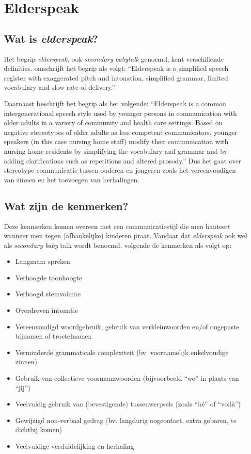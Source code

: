 \section{Elderspeak}

\subsection{Wat is \textit{elderspeak}?}

Het begrip \textit{elderspeak}, ook \textit{secondary babytalk} genoemd, kent verschillende definities. \textcite{Kemper1998} omschrijft het begrip als volgt:
``Elderspeak is a simplified speech register with exaggerated pitch and intonation, simplified grammar, limited vocabulary and slow rate of delivery.''

Daarnaast beschrijft \textcite{Williams2011} het begrip als het volgende:
``Elderspeak is a common intergenerational speech style used by younger persons in communication with older adults in a variety of community and health care settings. Based on negative stereotypes of older adults as less competent communicators, younger speakers (in this case nursing home staff) modify their communication with nursing home residents by simplifying the vocabulary and grammar and by adding clarifications such as repetitions and altered prosody.'' Dus het gaat over stereotype communicatie tussen ouderen en jongeren zoals het vereenvoudigen van zinnen en het toevoegen van herhalingen.

\subsection{Wat zijn de kenmerken?}
Deze kenmerken komen overeen met een communicatiestijl die men hanteert wanneer men tegen (afhankelijke) kinderen praat. Vandaar dat \textit{elderspeak} ook wel als \textit{secondary baby} talk wordt benoemd. \textcite{Campens2021} volgende de kenmerken als volgt op:

\begin{itemize}
    \item Langzaam spreken
    \item Verhoogde toonhoogte
    \item Verhoogd stemvolume
    \item Overdreven intonatie
    \item Vereenvoudigd woordgebruik, gebruik van verkleinwoorden en/of ongepaste bijnamen of troetelnamen
    \item Verminderde grammaticale complexiteit (bv. voornamelijk enkelvoudige zinnen)
    \item Gebruik van collectieve voornaamwoorden (bijvoorbeeld ``we'' in plaats van ``jij'')
    \item Veelvuldig gebruik van (bevestigende) tussenwerpsels (zoals ``hé'' of ``voilà'')
    \item Gewijzigd non-verbaal gedrag (bv. langdurig oogcontact, extra gebaren, te dichtbij komen)
    \item Veelvuldige verduidelijking en herhaling
\end{itemize}

